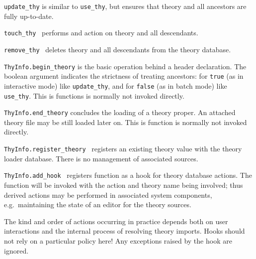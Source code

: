 \begin{isabellebody}
\begin{isamarkuptext}
\begin{description}
  \item \verb|update_thy| is similar to \verb|use_thy|, but ensures that
  theory  and all ancestors are fully up-to-date.

  \item \verb|touch_thy|~ performs and  action
  on theory  and all descendants.

  \item \verb|remove_thy|~ deletes theory  and all
  descendants from the theory database.

  \item \verb|ThyInfo.begin_theory| is the basic operation behind a
  \isa{{\isasymTHEORY}} header declaration.  The boolean argument
  indicates the strictness of treating ancestors: for \verb|true| (as
  in interactive mode) like \verb|update_thy|, and for \verb|false| (as
  in batch mode) like \verb|use_thy|.  This is {\ML} functions is
  normally not invoked directly.

  \item \verb|ThyInfo.end_theory| concludes the loading of a theory
  proper.  An attached theory {\ML} file may be still loaded later on.
  This is function is normally not invoked directly.

  \item \verb|ThyInfo.register_theory|~ registers an
  existing theory value with the theory loader database.  There is no
  management of associated sources.

  \item \verb|ThyInfo.add_hook|~ registers function  as a hook for theory database actions.  The function will be
  invoked with the action and theory name being involved; thus derived
  actions may be performed in associated system components, e.g.\
  maintaining the state of an editor for the theory sources.

  The kind and order of actions occurring in practice depends both on
  user interactions and the internal process of resolving theory
  imports.  Hooks should not rely on a particular policy here!  Any
  exceptions raised by the hook are ignored.

  \end{description}%
\end{isamarkuptext}%
\isamarkuptrue%
%
\endisatagmlref
{\isafoldmlref}%
%
\isadelimmlref
%
\endisadelimmlref
%
\isadelimtheory
%
\endisadelimtheory
%
\isatagtheory
{}\isamarkupfalse%
%
\endisatagtheory
{\isafoldtheory}%
%
\isadelimtheory
%
\endisadelimtheory
\isanewline
\end{isabellebody}%
